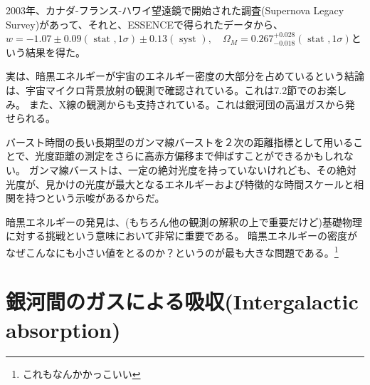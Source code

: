 \documentclass[11pt]{ltjsarticle}
\theoremstyle{plain}
\theoremstyle{break}
\begin{document}
2003年、カナダ-フランス-ハワイ望遠鏡で開始された調査(Supernova Legacy Survey)があって、それと、ESSENCEで得られたデータから、$w=-1.07 \pm 0.09(\text { stat }, 1 \sigma) \pm 0.13(\text { syst }), \quad \Omega_{M}=0.267_{-0.018}^{+0.028}(\text { stat }, 1 \sigma)$という結果を得た。

実は、暗黒エネルギーが宇宙のエネルギー密度の大部分を占めているという結論は、宇宙マイクロ背景放射の観測で確認されている。これは7.2節でのお楽しみ。
また、X線の観測からも支持されている。これは銀河団の高温ガスから発せられる。

バースト時間の長い長期型のガンマ線バーストを２次の距離指標として用いることで、光度距離の測定をさらに高赤方偏移まで伸ばすことができるかもしれない。
ガンマ線バーストは、一定の絶対光度を持っていないけれども、その絶対光度が、見かけの光度が最大となるエネルギーおよび特徴的な時間スケールと相関を持つという示唆があるからだ。

暗黒エネルギーの発見は、(もちろん他の観測の解釈の上で重要だけど)基礎物理に対する挑戦という意味において非常に重要である。
暗黒エネルギーの密度がなぜこんなにも小さい値をとるのか？というのが最も大きな問題である。\footnote{これもなんかかっこいい}

\newpage
\setcounter{section}{9}
\section{銀河間のガスによる吸収(Intergalactic absorption)}\label{sec1-10:Intergalactic-absorption}
\end{document}
